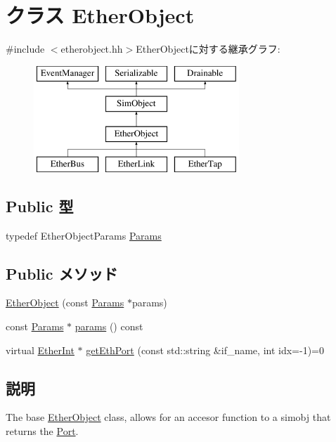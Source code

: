 \hypertarget{classEtherObject}{
\section{クラス EtherObject}
\label{classEtherObject}
}


{\ttfamily \#include $<$etherobject.hh$>$}EtherObjectに対する継承グラフ:\begin{figure}[H]
\begin{center}
\leavevmode
\includegraphics[height=4cm]{classEtherObject}
\end{center}
\end{figure}
\subsection*{Public 型}
\begin{DoxyCompactItemize}
\item 
typedef EtherObjectParams \hyperlink{classEtherObject_a47be5a25ff75cbf22f60f87dde950e13}{Params}
\end{DoxyCompactItemize}
\subsection*{Public メソッド}
\begin{DoxyCompactItemize}
\item 
\hyperlink{classEtherObject_a8de016313351ab48276a97c330db110c}{EtherObject} (const \hyperlink{classEtherObject_a47be5a25ff75cbf22f60f87dde950e13}{Params} $\ast$params)
\item 
const \hyperlink{classEtherObject_a47be5a25ff75cbf22f60f87dde950e13}{Params} $\ast$ \hyperlink{classEtherObject_acd3c3feb78ae7a8f88fe0f110a718dff}{params} () const 
\item 
virtual \hyperlink{classEtherInt}{EtherInt} $\ast$ \hyperlink{classEtherObject_ac1aa24c1f8c0f1ee8bdc3f3d3799f67c}{getEthPort} (const std::string \&if\_\-name, int idx=-\/1)=0
\end{DoxyCompactItemize}


\subsection{説明}
The base \hyperlink{classEtherObject}{EtherObject} class, allows for an accesor function to a simobj that returns the \hyperlink{classPort}{Port}. 

